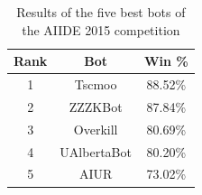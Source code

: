 \documentclass{llncs}
\begin{document}
\begin{table}[!t]
\caption{Results of the five best bots of the AIIDE 2015 competition}
\label{tab:aiide2015}
\centering
\begin{tabular}{|c|c|c|}
\hline
{\bfseries Rank} & {\bfseries Bot} & {\bfseries Win \%} \\
\hline
1 & Tscmoo & 88.52\% \\
2 & ZZZKBot & 87.84\% \\
3 & Overkill & 80.69\% \\
4 & UAlbertaBot & 80.20\% \\
5 & AIUR & 73.02\% \\
\hline
\end{tabular}
\end{table}


\end{document}
